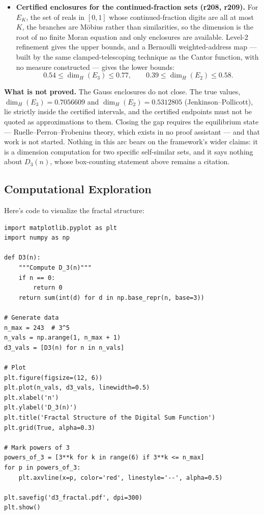 \begin{itemize}
measures. A side result mathlib also lacks, $1 \in \mathcal{C}$, was proved
along the way.
\item \textbf{Certified enclosures for the continued-fraction sets
(r208, r209).} For $E_K$, the set of reals in $[0,1]$ whose continued-fraction
digits are all at most $K$, the branches are M\"obius rather than
similarities, so the dimension is the root of no finite Moran equation and
only enclosures are available. Level-2 refinement gives the upper bounds, and
a Bernoulli weighted-address map --- built by the same clamped-telescoping
technique as the Cantor function, with no measure constructed --- gives the
lower bounds:
\[
0.54 \le \dim_H(E_3) \le 0.77,
\qquad
0.39 \le \dim_H(E_2) \le 0.58 .
\]
\end{itemize}

\noindent \textbf{What is not proved.} The Gauss enclosures do not close. The
true values, $\dim_H(E_3) = 0.7056609$ and $\dim_H(E_2) = 0.5312805$
(Jenkinson--Pollicott), lie strictly inside the certified intervals, and the
certified endpoints must not be quoted as approximations to them. Closing the
gap requires the equilibrium state --- Ruelle--Perron--Frobenius theory, which
exists in no proof assistant --- and that work is not started. Nothing in this
arc bears on the framework's wider claims: it is a dimension computation for
two specific self-similar sets, and it says nothing about $D_3(n)$, whose
box-counting statement above remains a citation.

\subsection{Computational Exploration}
\label{subsec:computational-fractal}

Here's code to visualize the fractal structure:

\begin{lstlisting}[style=python]
import matplotlib.pyplot as plt
import numpy as np

def D3(n):
    """Compute D_3(n)"""
    if n == 0:
        return 0
    return sum(int(d) for d in np.base_repr(n, base=3))

# Generate data
n_max = 243  # 3^5
n_vals = np.arange(1, n_max + 1)
d3_vals = [D3(n) for n in n_vals]

# Plot
plt.figure(figsize=(12, 6))
plt.plot(n_vals, d3_vals, linewidth=0.5)
plt.xlabel('n')
plt.ylabel('D_3(n)')
plt.title('Fractal Structure of the Digital Sum Function')
plt.grid(True, alpha=0.3)

# Mark powers of 3
powers_of_3 = [3**k for k in range(6) if 3**k <= n_max]
for p in powers_of_3:
    plt.axvline(x=p, color='red', linestyle='--', alpha=0.5)

plt.savefig('d3_fractal.pdf', dpi=300)
plt.show()
\end{lstlisting}

